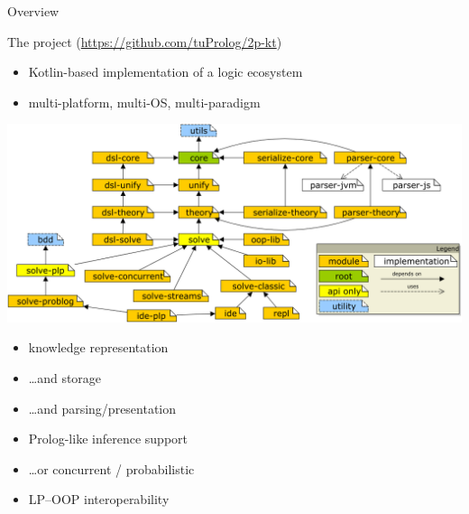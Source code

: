 \documentclass[presentation]{beamer}\mode<presentation>{\usetheme{AMSBolognaFC}}
\begin{document}
\begin{frame}{Overview}
    \begin{block}{The \twopkt{} project \hfill (\url{https://github.com/tuProlog/2p-kt})}
        \begin{itemize}
            \item Kotlin-based implementation of a logic ecosystem
            \item multi-platform, multi-OS, multi-paradigm
        \end{itemize}
    \end{block} 

    \begin{center}
        \includegraphics[width=.7\linewidth]{figures/project-map.png}    
    \end{center}

    \vspace{-.5cm}

    \begin{multicols}{2}
        \begin{itemize}\small
            \item knowledge representation
            
            \item \ldots and storage
            
            \item \ldots and parsing/presentation

            \item Prolog-like inference support
            \item \ldots or concurrent / probabilistic
            
            \item LP--OOP interoperability
        \end{itemize}
    \end{multicols}
\end{frame}
\end{document}
